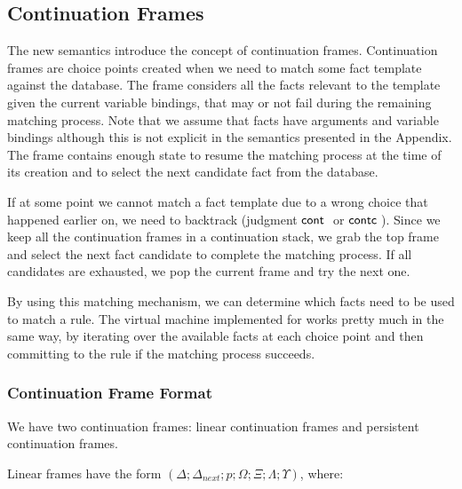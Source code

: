 \subsection{Continuation Frames}

The new semantics introduce the concept of continuation frames. Continuation frames are choice points
created when we need to match some fact template against the database. The frame considers all the facts
relevant to the template given the current variable bindings, that may or not fail during the remaining matching process. Note that we assume
that facts have arguments and variable bindings although this is not explicit in the semantics
presented in the Appendix.
The frame contains enough state to resume the matching process at the time of its creation and
to select the next candidate fact from the database.

If at some point we cannot match a fact template due to a wrong choice that happened earlier on,
we need to backtrack (judgment $\mathsf{cont} \;$ or $\mathsf{contc} \;$). Since we keep all the continuation frames in a continuation stack,
we grab the top frame and select the next fact candidate to complete the matching process.
If all candidates are exhausted, we pop the current frame and try the next one.

By using this matching mechanism, we can determine which facts need to be used to match a rule.
The virtual machine implemented for \lang works pretty much in the same way, by iterating over
the available facts at each choice point and then committing to the rule if the matching process
succeeds.

\subsubsection{Continuation Frame Format}

We have two continuation frames: linear continuation frames and persistent continuation frames.

Linear frames have the form $(\Delta; \Delta_{next}; p; \Omega; \Xi; \Lambda; \Upsilon)$, where:

